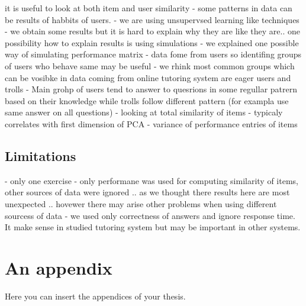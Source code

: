 \documentclass[
  digital, %
  table,   %
  nolof,     %
  nolot,     %
  nocover
]{fithesis3}
\begin{document}
it is useful to look at both item and user similarity - some
patterns in data can be results of habbits of users. - we are using
unsupervsed learning like techniques - we obtain some results but it is
hard to explain why they are like they are.. one possibility how to
explain results is using simulations - we explained one possible way of
simulating performance matrix - data fome from users so identifing
groups of users who behave same may be useful - we rhink most common
groups which can be vosibke in data coming from online tutoring system
are eager users and trolls - Main grohp of users tend to answer to
quesrions in some regullar patrern based on their knowledge while trolls
follow different pattern (for exampla use same answer on all questions)
- looking at total similarity of items - typicaly correlates with first
dimension of PCA - variance of performance entries of items



\section{Limitations}\label{limitations}

- only one exercise
- only performane was used for computing similarity of items, other sources of data were ignored .. as we thought there results here are most unexpected .. hovewer there may arise other problems when using different sourcess of data
- we used only correctness of answers and ignore response time. It make sense in studied tutoring system but may be important in other systems.


  \makeatletter\thesis@blocks@clear\makeatother
  \printindex

\appendix %
\chapter{An appendix}
Here you can insert the appendices of your thesis.
\end{document}
